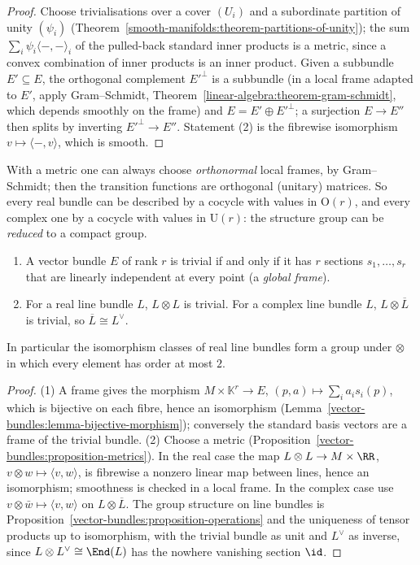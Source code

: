\begin{proof}
Choose trivialisations over a cover $(U_i)$ and a subordinate partition of unity $(\psi_i)$ (Theorem~\ref{smooth-manifolds:theorem-partitions-of-unity}); the sum $\sum_i\psi_i\langle -, - \rangle_i$ of the
pulled-back standard inner products is a metric, since a convex combination of inner products is an inner product. Given a subbundle $E' \subseteq E$, the orthogonal complement $E'^\perp$ is a subbundle (in a
local frame adapted to $E'$, apply Gram--Schmidt, Theorem~\ref{linear-algebra:theorem-gram-schmidt}, which depends smoothly on the frame) and $E = E' \oplus E'^\perp$; a surjection $E \to E''$ then splits
by inverting $E'^\perp \to E''$. Statement (2) is the fibrewise isomorphism $v \mapsto \langle -, v \rangle$, which is smooth.
\end{proof}

With a metric one can always choose \emph{orthonormal} local frames, by Gram--Schmidt; then the transition functions are orthogonal (unitary) matrices. So every real bundle can
be described by a cocycle with values in $\mathrm{O}(r)$, and every complex one by a cocycle with values in $\mathrm{U}(r)$: the structure group can be \emph{reduced} to a compact group.

\begin{proposition}\label{vector-bundles:proposition-frames}
\begin{enumerate}
\item A vector bundle $E$ of rank $r$ is trivial if and only if it has $r$ sections $s_1, \ldots, s_r$ that are linearly independent at every point (a \emph{global frame}).
\item For a real line bundle $L$, $L \otimes L$ is trivial. For a complex line bundle $L$, $L \otimes \overline{L}$ is trivial, so $\overline{L} \cong L^\vee$.
\end{enumerate}
In particular the isomorphism classes of real line bundles form a group under $\otimes$ in which every element has order at most $2$.
\end{proposition}

\begin{proof}
(1) A frame gives the morphism $M \times \mathbb{K}^r \to E$, $(p, a) \mapsto \sum_ia_is_i(p)$, which is bijective on each fibre, hence an isomorphism
(Lemma~\ref{vector-bundles:lemma-bijective-morphism}); conversely the standard basis vectors are a frame of the trivial bundle. (2) Choose a metric (Proposition~\ref{vector-bundles:proposition-metrics}).
In the real case the map $L \otimes L \to M \times \RR$, $v \otimes w \mapsto \langle v, w\rangle$, is fibrewise a nonzero linear map between lines, hence an isomorphism; smoothness is checked in a local frame. In the
complex case use $v \otimes \bar w \mapsto \langle v, w\rangle$ on $L \otimes \overline{L}$. The group structure on line bundles is Proposition~\ref{vector-bundles:proposition-operations} and the uniqueness of
tensor products up to isomorphism, with the trivial bundle as unit and $L^\vee$ as inverse, since $L \otimes L^\vee \cong \End(L)$ has the nowhere vanishing section $\id$.
\end{proof}

